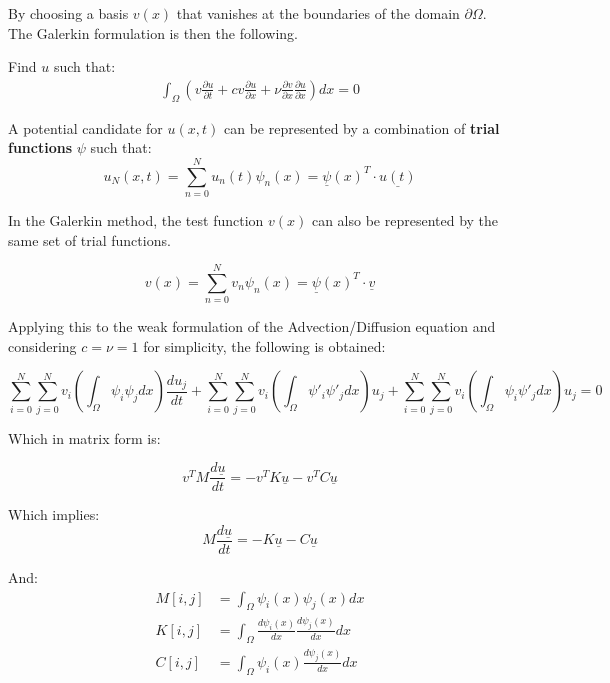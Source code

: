 \documentclass[
]{scrartcl}
\begin{document}
By choosing a basis \(v(x)\) that vanishes at the boundaries of the
domain \(\partial\Omega\). The Galerkin formulation is then the
following.

Find \(u\) such that: \begin{align}
\int_{\Omega} (v\frac{\partial u}{\partial t} + cv\frac{\partial u}{\partial x} + \nu\frac{\partial v}{\partial x}\frac{\partial u}{\partial x})dx = 0
\end{align}

A potential candidate for \(u(x,t)\) can be represented by a combination
of \textbf{trial functions} \(\psi\) such that: \begin{equation}
    u_N(x,t) = \sum_{n=0}^N u_n(t) \psi_n(x) = \underline{\psi}(x)^T \cdot \underline{u(t)}
\end{equation}

In the Galerkin method, the test function \(v(x)\) can also be
represented by the same set of trial functions.

\begin{equation}
    v(x) = \sum_{n=0}^N v_n \psi_n(x) = \underline{\psi}(x)^T \cdot \underline{v}
\end{equation}

Applying this to the weak formulation of the Advection/Diffusion
equation and considering \(c=\nu=1\) for simplicity, the following is
obtained:

\begin{equation}
 \sum_{i=0}^{N}\sum_{j=0}^{N} v_i( \int_{\Omega}\psi_{i}\psi_{j}dx)\frac{du_j}{dt}+\sum_{i=0}^{N}\sum_{j=0}^{N} v_i( \int_{\Omega}\psi'_{i}\psi'_{j}dx)u_j+\sum_{i=0}^{N}\sum_{j=0}^{N} v_i( \int_{\Omega}\psi_{i}\psi'_{j}dx)u_j=0
\end{equation}

Which in matrix form is:

\begin{equation}
v^{T}M\frac{d\underline{u}}{dt}=-v^{T}K\underline{u}-v^{T}C\underline{u}
\end{equation}

Which implies: \begin{equation}
M\frac{d\underline{u}}{dt}=-K\underline{u}-C\underline{u}
\end{equation}

And: \begin{align}
M[i,j]&=\int_{\Omega}\psi_i(x)\psi_j(x)dx \\
K[i,j]&=\int_{\Omega}\frac{d\psi_i(x)}{dx}\frac{d\psi_j(x)}{dx}dx \\
C[i,j] &= \int_{\Omega}\psi_i(x)\frac{d\psi_j(x)}{dx}dx \\
\end{align}
\end{document}
